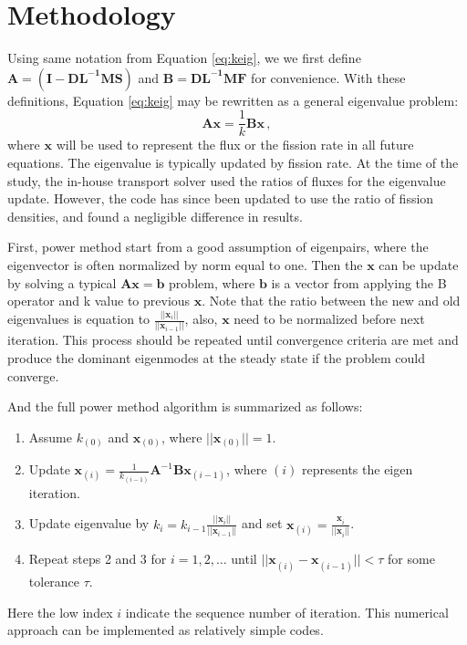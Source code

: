 \section{Methodology}
Using same notation from Equation \ref{eq:keig}, we we first define $\mathbf{A} =  \mathbf{(I - DL^{-1}MS)}$ and $\mathbf{B} = \mathbf{DL^{-1}MF}$ for convenience.
With these definitions, Equation \ref{eq:keig} may be rewritten as a general eigenvalue problem:
\begin{equation}
\mathbf{A} \mathbf{x} = \frac{1}{k} \mathbf{B} \mathbf{x} \, ,
\label{eq:eigenvalue}
\end{equation}
where $\mathbf{x}$ will be used to represent the flux or the fission rate in all future equations.
The eigenvalue is typically updated by fission rate.
At the time of the study, the in-house transport solver used the ratios of fluxes for the eigenvalue update.
However, the code has since been updated to use the ratio of fission densities, and found a negligible difference in results.

First, power method start from a good assumption of eigenpairs, where the eigenvector is often normalized by norm equal to one.
Then the $\mathbf{x}$ can be update by solving a typical $\mathbf{A} \mathbf{x} =\mathbf{b}$ problem, where $\mathbf{b}$ is a vector from applying the B operator and k value to previous $\mathbf{x}$.
Note that the ratio between the new and old eigenvalues is equation to $\frac{||\mathbf{x}_{i}||}{||\mathbf{x}_{i-1}||}$, also, $\mathbf{x}$ need to be normalized before next iteration. 
This process should be repeated until convergence criteria are met and produce the dominant eigenmodes at the steady state if the problem could converge.

And the full power method algorithm is summarized as follows:
\begin{enumerate}
  \item Assume $k_{(0)}$ and $\mathbf{x}_{(0)}$, where $||\mathbf{x}_{(0)}||=1$.
  \item Update $\mathbf{x}_{(i)} = \frac{1}{k_{(i-1)}} \mathbf{A}^{-1} \mathbf{B} \mathbf{x}_{(i-1)}$, where $(i)$ represents the eigen iteration.
  \item Update eigenvalue by  $k_{i} = k_{i-1} \frac{||\mathbf{x}_{i}||}{||\mathbf{x}_{i-1}||}$ and set  $\mathbf{x}_{(i)} =\frac{\mathbf{x}^{}_{i}}{||\mathbf{x}^{}_{i}||}$.
  \item Repeat steps 2 and 3 for $i = 1, 2, \ldots$ until $||\mathbf{x}^{}_{(i)} - \mathbf{x}^{}_{(i-1)}|| < \tau$ for some tolerance $\tau$.
\end{enumerate}
Here the low index $i$ indicate the sequence number of iteration.
This numerical approach can be implemented as relatively simple codes.

